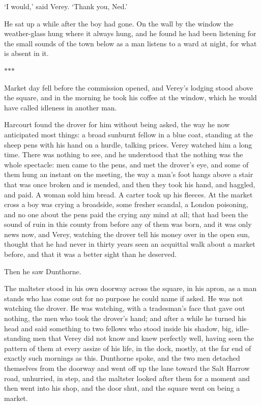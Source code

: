 \documentclass[11pt]{article}
\newcommand{\scenebreak}{%
  \par\vspace{1.1\baselineskip}%
  {\centering $\ast$\quad$\ast$\quad$\ast$\par}%
  \vspace{1.1\baselineskip}\noindent}
\begin{document}
`I would,' said Verey. `Thank you, Ned.'

He sat up a while after the boy had gone. On the wall by the window the weather-glass hung where it always hung, and he found he had been listening for the small sounds of the town below as a man listens to a ward at night, for what is absent in it.

\scenebreak
\noindent Market day fell before the commission opened, and Verey's lodging stood above the square, and in the morning he took his coffee at the window, which he would have called idleness in another man.

Harcourt found the drover for him without being asked, the way he now anticipated most things: a broad sunburnt fellow in a blue coat, standing at the sheep pens with his hand on a hurdle, talking prices. Verey watched him a long time. There was nothing to see, and he understood that the nothing was the whole spectacle: men came to the pens, and met the drover's eye, and some of them hung an instant on the meeting, the way a man's foot hangs above a stair that was once broken and is mended, and then they took his hand, and haggled, and paid. A woman sold him bread. A carter took up his fleeces. At the market cross a boy was crying a broadside, some fresher scandal, a London poisoning, and no one about the pens paid the crying any mind at all; that had been the sound of ruin in this county from before any of them was born, and it was only news now, and Verey, watching the drover tell his money over in the open sun, thought that he had never in thirty years seen an acquittal walk about a market before, and that it was a better sight than he deserved.

Then he saw Dunthorne.

The maltster stood in his own doorway across the square, in his apron, as a man stands who has come out for no purpose he could name if asked. He was not watching the drover. He was watching, with a tradesman's face that gave out nothing, the men who took the drover's hand; and after a while he turned his head and said something to two fellows who stood inside his shadow, big, idle-standing men that Verey did not know and knew perfectly well, having seen the pattern of them at every assize of his life, in the dock, mostly, at the far end of exactly such mornings as this. Dunthorne spoke, and the two men detached themselves from the doorway and went off up the lane toward the Salt Harrow road, unhurried, in step, and the maltster looked after them for a moment and then went into his shop, and the door shut, and the square went on being a market.
\end{document}
